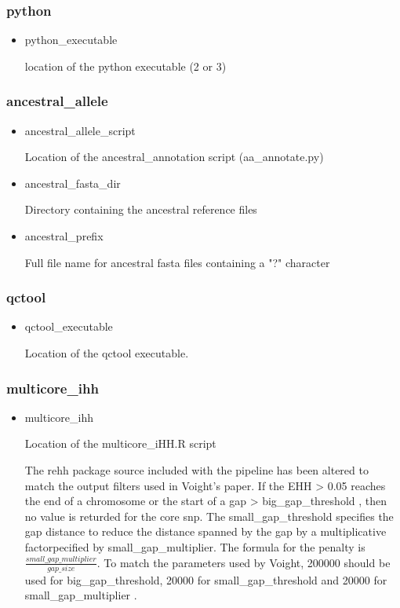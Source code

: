 \documentclass[a4paper,10pt]{article}
\begin{document}
\subsubsection{python}
\begin{itemize}
\item python\_executable 

location of the python executable (2 or 3)
\end{itemize}
\subsubsection{ancestral\_allele}
\begin{itemize}
\item ancestral\_allele\_script

Location of the ancestral\_annotation script (aa\_annotate.py)
\item ancestral\_fasta\_dir 

Directory containing the ancestral reference files
\item ancestral\_prefix 

Full file name for ancestral fasta files containing a "?" character
\end{itemize}
\subsubsection{qctool}
\begin{itemize}
\item qctool\_executable

Location of the qctool executable.
\end{itemize}
\subsubsection{multicore\_ihh}
\begin{itemize}
\item multicore\_ihh

Location of the multicore\_iHH.R script

The rehh package source included with the pipeline has been altered to match the output filters used in Voight's paper. If the EHH > 0.05 reaches the end of a chromosome or the start of a gap > big\_gap\_threshold , then no value is returded for the core snp. The small\_gap\_threshold specifies the gap distance to reduce the distance spanned by the gap by a multiplicative factorpecified by small\_gap\_multiplier. The formula for the penalty is $\frac{small\_gap\_multiplier}{gap\_size}$. To match the parameters used by Voight, 200000 should be  used for big\_gap\_threshold, 20000 for small\_gap\_threshold and 20000 for small\_gap\_multiplier \citep{Voight:2006go}.

\end{itemize}
\end{document}
